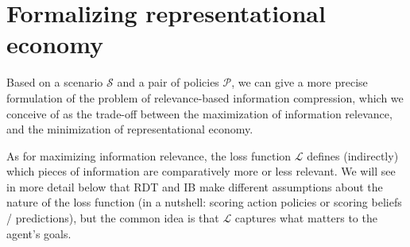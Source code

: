 \documentclass[nobib,nofonts]{tufte-handout}
\begin{document}
\section{Formalizing representational economy}

Based on a scenario $\mathcal{S}$ and a pair of policies $\mathcal{P}$, we can give a more precise formulation of the problem of relevance-based information compression, which we conceive of as the trade-off between the maximization of information relevance, and the minimization of representational economy.

As for maximizing information relevance, the loss function $\mathcal{L}$ defines (indirectly) which pieces of information are comparatively more or less relevant.
We will see in more detail below that RDT and IB make different assumptions about the nature of the loss function (in a nutshell: scoring action policies or scoring beliefs / predictions), but the common idea is that $\mathcal{L}$ captures what matters to the agent's goals.
\end{document}
